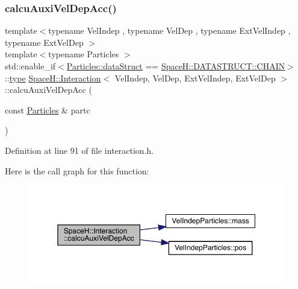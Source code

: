 \subsubsection{\texorpdfstring{calcu\+Auxi\+Vel\+Dep\+Acc()}{calcuAuxiVelDepAcc()}\hspace{0.1cm}{\footnotesize\ttfamily [2/2]}}
{\footnotesize\ttfamily template$<$typename Vel\+Indep , typename Vel\+Dep , typename Ext\+Vel\+Indep , typename Ext\+Vel\+Dep $>$ \\
template$<$typename Particles $>$ \\
std\+::enable\+\_\+if$<$\mbox{\hyperlink{class_vel_indep_particles_a6d357b21c216a2b079b1927c18de0b8f}{Particles\+::data\+Struct}} == \mbox{\hyperlink{namespace_space_h_a0af19f79a6498e99dbda772053d44a72a014d2cf3cdc3af6f4f92c09190860e33}{Space\+H\+::\+D\+A\+T\+A\+S\+T\+R\+U\+C\+T\+::\+C\+H\+A\+IN}}$>$\+::\mbox{\hyperlink{class_space_h_1_1_interaction_a0bed18b8b8efcb42be264a255f931be6}{type}} \mbox{\hyperlink{class_space_h_1_1_interaction}{Space\+H\+::\+Interaction}}$<$ Vel\+Indep, Vel\+Dep, Ext\+Vel\+Indep, Ext\+Vel\+Dep $>$\+::calcu\+Auxi\+Vel\+Dep\+Acc (\begin{DoxyParamCaption}\item[{const \mbox{\hyperlink{struct_particles}{Particles}} \&}]{partc }\end{DoxyParamCaption})\hspace{0.3cm}{\ttfamily [inline]}}



Definition at line 91 of file interaction.\+h.

Here is the call graph for this function\+:\nopagebreak
\begin{figure}[H]
\begin{center}
\leavevmode
\includegraphics[width=350pt]{class_space_h_1_1_interaction_addc5bcf2c12d28945af7c78a464b599e_cgraph}
\end{center}
\end{figure}
\mbox{\label{class_space_h_1_1_interaction_a29ebcdb5fb80bea1f0bc2de302a6cb15}} 
